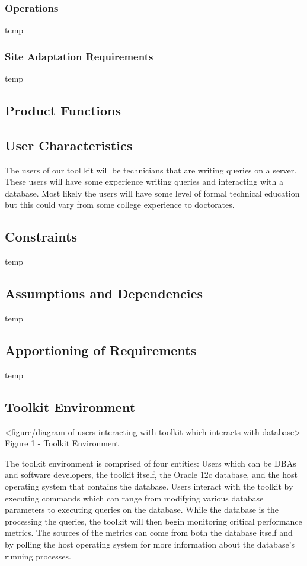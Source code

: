 \documentclass[draftclsnofoot, onecolumn, 10pt]{IEEEtran}
\begin{document}
\subsubsection{Operations}
temp

\subsubsection{Site Adaptation Requirements}
temp

\subsection{Product Functions}

\subsection{User Characteristics}
The users of our tool kit will be technicians that are writing queries on a server. These users will have some experience writing queries and interacting with a database. Most likely the users will have some level of formal technical education but this could vary from some college experience to doctorates.  

\subsection{Constraints}
temp

\subsection{Assumptions and Dependencies}
temp

\subsection{Apportioning of Requirements}
temp

\subsection{Toolkit Environment}
<figure/diagram of users interacting with toolkit which interacts with database>
Figure 1 - Toolkit Environment

The toolkit environment is comprised of four entities: Users which can be DBAs and software developers, the toolkit itself, the Oracle 12c database, and the host operating system that contains the database. Users interact with the toolkit by executing commands which can range from modifying various database parameters to executing queries on the database. While the database is the processing the queries, the toolkit will then begin monitoring critical performance metrics. The sources of the metrics can come from both the database itself and by polling the host operating system for more information about the database’s running processes.
\end{document}
